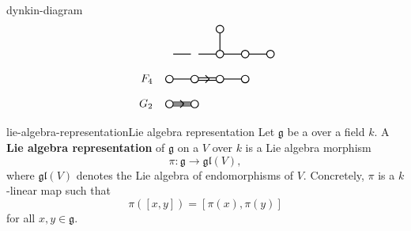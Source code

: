 \begin{example}{dynkin-diagram}
\[\begin{tikzpicture}[scale=.4]
\begin{scope}[yshift=-20.0cm]
            \draw[thick] (4cm,0) circle (.3cm);
            \draw[thick] (6cm,0) circle (.3cm);
            \draw[thick] (8cm,0) circle (.3cm);
            \draw[thick] (4cm,2cm) circle (.3cm);
            \draw[thick] (0.3cm,0) -- +(1.4 cm,0);
            \draw[thick] (2.3cm,0) -- +(1.4 cm,0);
            \draw[thick] (4.3cm,0) -- +(1.4 cm,0);
            \draw[thick] (6.3cm,0) -- +(1.4 cm,0);
            \draw[thick] (4cm,0.3cm) -- +(0cm,1.4cm);
        \end{scope}
        \begin{scope}[yshift=-22.0cm]
            \draw (-1,0) node[anchor=east] {$F_4$};
            \draw[thick] (0cm,0) circle (.3cm);
            \draw[thick] (2cm,0) circle (.3cm);
            \draw[thick] (4cm,0) circle (.3cm);
            \draw[thick] (6cm,0) circle (.3cm);
            \draw[thick] (0.3cm,0) -- +(1.4 cm,0);
            \draw[thick] (4.3cm,0) -- +(1.4 cm,0);
            \draw[thick] (2.3cm,0.1cm) -- +(1.4 cm,0);
            \draw[thick] (2.3cm,-0.1cm) -- +(1.4 cm,0);
            \draw[thick] (2.85cm,0.3cm) -- +(0.3cm,-0.3cm);
            \draw[thick] (2.85cm,-0.3cm) -- +(0.3cm,0.3cm);
        \end{scope}
        \begin{scope}[yshift=-24.0cm]
            \draw (-1,0) node[anchor=east] {$G_2$};
            \draw[thick] (0cm,0) circle (.3cm);
            \draw[thick] (2cm,0) circle (.3cm);
            \draw[thick] (0.3cm,0.15cm) -- +(1.4 cm,0cm);
            \draw[thick] (0.3cm,0cm) -- +(1.4 cm,0cm);
            \draw[thick] (0.3cm,-0.15cm) -- +(1.4 cm,0cm);
            \draw[thick] (0.85cm,0.3cm) -- +(0.3cm,-0.3cm);
            \draw[thick] (0.85cm,-0.3cm) -- +(0.3cm,0.3cm);
        \end{scope}
    \end{tikzpicture} \]
\end{example}

\begin{topic}{lie-algebra-representation}{Lie algebra representation}
    Let $\mathfrak{g}$ be a  over a field $k$. A \textbf{Lie algebra representation} of $\mathfrak{g}$ on a  $V$ over $k$ is a Lie algebra morphism
    \[ \pi : \mathfrak{g} \to \mathfrak{gl}(V) , \]
    where $\mathfrak{gl}(V)$ denotes the Lie algebra of endomorphisms of $V$. Concretely, $\pi$ is a $k$-linear map such that
    \[ \pi([x, y]) = [\pi(x), \pi(y)] \]
    for all $x, y \in \mathfrak{g}$.
\end{topic}

